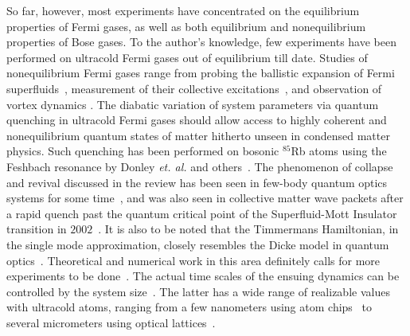 \documentclass[aps,pra,floats,epsfig,pdflatex]{revtex4}                                                              %
\begin{document}
So far, however, most experiments have concentrated on the equilibrium properties of Fermi gases, as well as both equilibrium and nonequilibrium properties of Bose gases. To the author's knowledge, few experiments have been performed on ultracold Fermi gases out of equilibrium till date. Studies of nonequilibrium Fermi gases  range from probing the ballistic expansion of Fermi superfluids~\cite{ohara1}, measurement of their collective excitations~\cite{barnstein1}, and observation of vortex dynamics \cite{zwierlien1}. The diabatic variation of system parameters via quantum quenching in ultracold Fermi gases should allow access to highly coherent and nonequilibrium quantum states of matter hitherto unseen in condensed matter physics. Such quenching has been performed on bosonic $^{85}$Rb atoms using the Feshbach resonance by Donley \textit{et. al.} and others~\cite{bcsbec:coll}. The phenomenon of collapse and revival discussed in the review has been seen in few-body quantum optics systems for some time~\cite{
colrev:oldexp}, and was also seen in collective matter wave packets after a rapid quench past the quantum critical point of the Superfluid-Mott Insulator transition in $2002$~\cite{colrev:exp}. It is also to be noted that the Timmermans Hamiltonian, in the single mode approximation, closely resembles the Dicke model in quantum optics~\cite{yuzbashyan}. Theoretical and numerical work in this area definitely calls for more experiments to be done~\cite{theo:num}. The actual time scales of the ensuing dynamics can be controlled by the system size~\cite{myrefs}. The latter has a wide range of realizable values with ultracold atoms, ranging from a few nanometers using atom chips~\cite{atomchip} to several micrometers using optical lattices~\cite{hrishi}.
\end{document}
